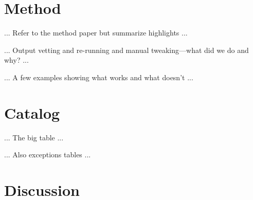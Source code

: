 \section{Method}

... Refer to the method paper but summarize highlights ...

... Output vetting and re-running and manual tweaking---what did we do and why? ...

... A few examples showing what works and what doesn't ...

\section{Catalog}

... The big table ...

... Also exceptions tables ...

\section{Discussion}


